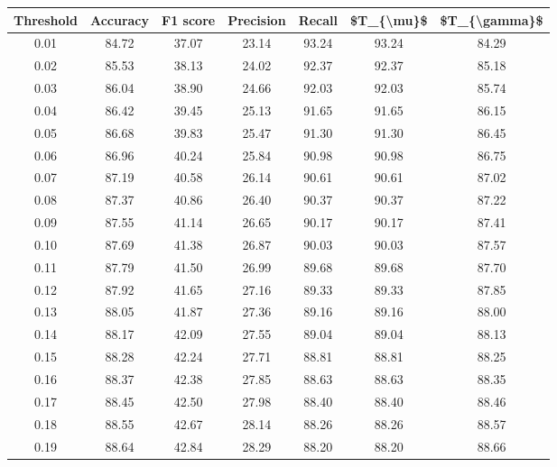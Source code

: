 \begin{tabular}{|c|c|c|c|c|c|c|}
\hline
 Threshold &  Accuracy &  F1 score &  Precision &  Recall &  \$T\_\{\textbackslash mu\}\$ &  \$T\_\{\textbackslash gamma\}\$ \\
\hline
      0.01 &     84.72 &     37.07 &      23.14 &   93.24 &      93.24 &         84.29 \\
      0.02 &     85.53 &     38.13 &      24.02 &   92.37 &      92.37 &         85.18 \\
      0.03 &     86.04 &     38.90 &      24.66 &   92.03 &      92.03 &         85.74 \\
      0.04 &     86.42 &     39.45 &      25.13 &   91.65 &      91.65 &         86.15 \\
      0.05 &     86.68 &     39.83 &      25.47 &   91.30 &      91.30 &         86.45 \\
      0.06 &     86.96 &     40.24 &      25.84 &   90.98 &      90.98 &         86.75 \\
      0.07 &     87.19 &     40.58 &      26.14 &   90.61 &      90.61 &         87.02 \\
      0.08 &     87.37 &     40.86 &      26.40 &   90.37 &      90.37 &         87.22 \\
      0.09 &     87.55 &     41.14 &      26.65 &   90.17 &      90.17 &         87.41 \\
      0.10 &     87.69 &     41.38 &      26.87 &   90.03 &      90.03 &         87.57 \\
      0.11 &     87.79 &     41.50 &      26.99 &   89.68 &      89.68 &         87.70 \\
      0.12 &     87.92 &     41.65 &      27.16 &   89.33 &      89.33 &         87.85 \\
      0.13 &     88.05 &     41.87 &      27.36 &   89.16 &      89.16 &         88.00 \\
      0.14 &     88.17 &     42.09 &      27.55 &   89.04 &      89.04 &         88.13 \\
      0.15 &     88.28 &     42.24 &      27.71 &   88.81 &      88.81 &         88.25 \\
      0.16 &     88.37 &     42.38 &      27.85 &   88.63 &      88.63 &         88.35 \\
      0.17 &     88.45 &     42.50 &      27.98 &   88.40 &      88.40 &         88.46 \\
      0.18 &     88.55 &     42.67 &      28.14 &   88.26 &      88.26 &         88.57 \\
      0.19 &     88.64 &     42.84 &      28.29 &   88.20 &      88.20 &         88.66 \\

\end{tabular}
